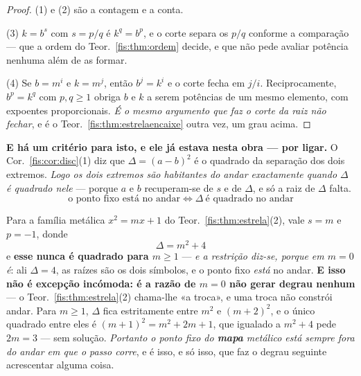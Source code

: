 \documentclass[livro.tex]{subfiles}
\begin{document}
\begin{proof}
(1) e (2) são a contagem e a conta.

(3) $k=b^{s}$ com $s=p/q$ é $k^{q}=b^{p}$, e o corte separa os $p/q$ conforme a
comparação --- que a ordem do Teor.~\ref{fis:thm:ordem} decide, e que não pede
avaliar potência nenhuma além de as formar.

(4) Se $b=m^{i}$ e $k=m^{j}$, então $b^{j}=k^{i}$ e o corte fecha em $j/i$.
Reciprocamente, $b^{p}=k^{q}$ com $p,q\ge1$ obriga $b$ e $k$ a serem potências de
um mesmo elemento, com expoentes proporcionais. \emph{É o mesmo argumento que faz
o corte da raiz não fechar}, e é o Teor.~\ref{fis:thm:estrelaencaixe} outra vez,
um grau acima.
\end{proof}


\medskip\noindent\textbf{E há um critério para isto, e ele já estava nesta obra
--- por ligar.} O Cor.~\ref{fis:cor:disc}(1) diz que $\Delta=(a-b)^{2}$ é o
quadrado da separação dos dois extremos. \emph{Logo os dois extremos são
habitantes do andar exactamente quando $\Delta$ é quadrado nele} --- porque
$a$ e $b$ recuperam-se de $s$ e de $\Delta$, e só a raiz de $\Delta$ falta.
\[
\boxed{\;\text{o ponto fixo está no andar}\iff\Delta\ \text{é quadrado no andar}\;}
\]

\begin{corolario}\label{fis:cor:geradorfora}
Para a família metálica $x^{2}=mx+1$ do Teor.~\ref{fis:thm:estrela}(2), vale
$s=m$ e $p=-1$, donde
\[
\boxed{\;\Delta=m^{2}+4\;}
\]
e \textbf{esse nunca é quadrado para $m\ge1$} --- \emph{e a restrição diz-se,
porque em $m=0$ é}: ali $\Delta=4$, as raízes são os dois símbolos, e o ponto fixo
\emph{está} no andar. \textbf{E isso não é excepção incómoda: é a razão de $m=0$
não gerar degrau nenhum} --- o Teor.~\ref{fis:thm:estrela}(2) chama-lhe «a troca»,
e uma troca não constrói andar. Para $m\ge1$, $\Delta$ fica estritamente entre $m^{2}$ e $(m+2)^{2}$,
e o único quadrado entre eles é $(m+1)^{2}=m^{2}+2m+1$, que igualado a $m^{2}+4$
pede $2m=3$ --- sem solução. \emph{Portanto o ponto fixo do \textbf{mapa} metálico está
sempre fora do andar em que o passo corre}, e é isso, e só isso, que faz o degrau
seguinte acrescentar alguma coisa.
\end{corolario}
\end{document}
